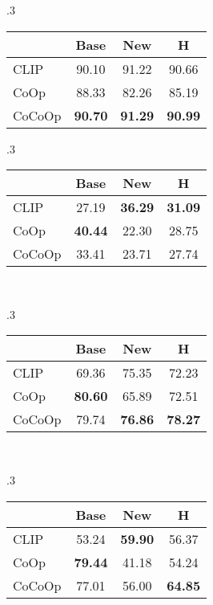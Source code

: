 \documentclass[10pt,twocolumn,letterpaper]{article}
\begin{document}
\begin{table*}[t]
\begin{subtable}[t]{.3\textwidth}
    \begin{tabular}{l cc|c}
    \toprule
    & Base & New & H \\
    \midrule
    CLIP & 90.10 & 91.22 & 90.66 \\
    CoOp & 88.33 & 82.26 & 85.19 \\
    \rowcolor{tabhighlight}
    CoCoOp & \textbf{90.70} & \textbf{91.29} & \textbf{90.99} \\
    \bottomrule
    \end{tabular}
    \end{subtable}
    \vspace{1em}
    \begin{subtable}[t]{.3\textwidth}
    \centering
    \caption{FGVCAircraft.}
    \begin{tabular}{l cc|c}
    \toprule
    & Base & New & H \\
    \midrule
    CLIP & 27.19 & \textbf{36.29} & \textbf{31.09} \\
    CoOp & \textbf{40.44} & 22.30 & 28.75 \\
    \rowcolor{tabhighlight}
    CoCoOp & 33.41 & 23.71 & 27.74 \\
    \bottomrule
    \end{tabular}
    \end{subtable}
    ~
    \begin{subtable}[t]{.3\textwidth}
    \centering
    \caption{SUN397.}
    \begin{tabular}{l cc|c}
    \toprule
    & Base & New & H \\
    \midrule
    CLIP & 69.36 & 75.35 & 72.23 \\
    CoOp & \textbf{80.60} & 65.89 & 72.51 \\
    \rowcolor{tabhighlight}
    CoCoOp & 79.74 & \textbf{76.86} & \textbf{78.27} \\
    \bottomrule
    \end{tabular}
    \end{subtable}
    ~
    \begin{subtable}[t]{.3\textwidth}
    \centering
    \caption{DTD.}
    \begin{tabular}{l cc|c}
    \toprule
    & Base & New & H \\
    \midrule
    CLIP & 53.24 & \textbf{59.90} & 56.37 \\
    CoOp & \textbf{79.44} & 41.18 & 54.24 \\
    \rowcolor{tabhighlight}
    CoCoOp & 77.01 & 56.00 & \textbf{64.85} \\
    \bottomrule

\end{tabular}
\end{subtable}
\end{table*}
\end{document}
